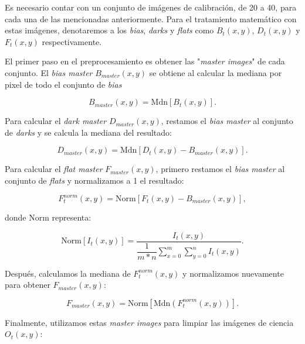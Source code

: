 Es necesario contar con un conjunto de imágenes de calibración, de 20 a 40, para cada una de las mencionadas anteriormente. Para el tratamiento matemático con estas imágenes, denotaremos a los \textit{bias}, \textit{darks} y \textit{flats} como $B_{t}(x,y)$, $D_{t}(x,y)$ y $F_{t}(x,y)$ respectivamente.

El primer paso en el preprocesamiento es obtener las "\textit{master images}" de cada conjunto. El \textit{bias master} $B_{master}(x,y)$ se obtiene al calcular la mediana por pixel de todo el conjunto de \textit{bias}

\begin{equation}
  \displaystyle B_{master}(x,y) = \mbox{Mdn} \left[ B_{t}(x,y) \right].
\end{equation}

Para calcular el \textit{dark master} $D_{master}(x,y)$, restamos el \textit{bias master} al conjunto de \textit{darks} y se calcula la mediana del resultado:

\begin{equation}
  \displaystyle D_{master}(x,y) = \mbox{Mdn} \left[ D_{t}(x,y) - B_{master}(x,y)\right].
\end{equation}

Para calcular el \textit{flat master} $F_{master}(x,y)$, primero restamos el \textit{bias master} al conjunto de \textit{flats} y normalizamos a 1 el resultado:

\begin{equation}
  \displaystyle F^{norm}_{t}(x,y) = \mbox{Norm} \left[ F_{t}(x,y) - B_{master}(x,y)\right],
\end{equation}

donde $\mbox{Norm}$ representa:

\begin{equation}
  \displaystyle \mbox{Norm}\left[I_{t}(x,y)\right] =  \dfrac{I_{t}(x,y)}{\dfrac{1}{m*n} \sum_{x=0}^{m}\sum_{y=0}^{n} I_{t}(x,y)}.
\end{equation}

Después, calculamos la mediana de $F^{norm}_{t}(x,y)$ y normalizamos nuevamente para obtener $F_{master}(x,y)$:

\begin{equation}
  \displaystyle F_{master}(x,y) = \mbox{Norm} \left[ \mbox{Mdn} \left( F^{norm}_{t}(x,y)\right)\right].
\end{equation}

Finalmente, utilizamos estas \textit{master images} para limpiar las imágenes de ciencia $O_{t}(x,y)$:

